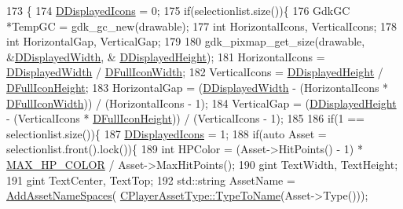 \begin{DoxyCode}
173                                                                                                            
                               \{
174     \hyperlink{classCUnitDescriptionRenderer_a0f2d234d02c615ac28812508c77ec414}{DDisplayedIcons} = 0;
175     \textcolor{keywordflow}{if}(selectionlist.size())\{
176         GdkGC *TempGC = gdk\_gc\_new(drawable);
177         \textcolor{keywordtype}{int} HorizontalIcons, VerticalIcons;
178         \textcolor{keywordtype}{int} HorizontalGap, VerticalGap;
179         
180         gdk\_pixmap\_get\_size(drawable, &\hyperlink{classCUnitDescriptionRenderer_a4c472ecc82b5956fc65aeebb2faf17fd}{DDisplayedWidth}, &
      \hyperlink{classCUnitDescriptionRenderer_acc5f08d377a050f778614561a0b12a6c}{DDisplayedHeight}); 
181         HorizontalIcons = \hyperlink{classCUnitDescriptionRenderer_a4c472ecc82b5956fc65aeebb2faf17fd}{DDisplayedWidth} / \hyperlink{classCUnitDescriptionRenderer_a4bd79032fe13b9c09386a24cb8ef7650}{DFullIconWidth};
182         VerticalIcons = \hyperlink{classCUnitDescriptionRenderer_acc5f08d377a050f778614561a0b12a6c}{DDisplayedHeight} / \hyperlink{classCUnitDescriptionRenderer_ae9f7d843d0eabd4b1f1b19bfa5332754}{DFullIconHeight};
183         HorizontalGap = (\hyperlink{classCUnitDescriptionRenderer_a4c472ecc82b5956fc65aeebb2faf17fd}{DDisplayedWidth} - (HorizontalIcons * 
      \hyperlink{classCUnitDescriptionRenderer_a4bd79032fe13b9c09386a24cb8ef7650}{DFullIconWidth})) / (HorizontalIcons - 1);
184         VerticalGap = (\hyperlink{classCUnitDescriptionRenderer_acc5f08d377a050f778614561a0b12a6c}{DDisplayedHeight} - (VerticalIcons * 
      \hyperlink{classCUnitDescriptionRenderer_ae9f7d843d0eabd4b1f1b19bfa5332754}{DFullIconHeight})) / (VerticalIcons - 1);
185 
186         \textcolor{keywordflow}{if}(1 == selectionlist.size())\{
187             \hyperlink{classCUnitDescriptionRenderer_a0f2d234d02c615ac28812508c77ec414}{DDisplayedIcons} = 1;
188             \textcolor{keywordflow}{if}(\textcolor{keyword}{auto} Asset = selectionlist.front().lock())\{
189                 \textcolor{keywordtype}{int} HPColor = (Asset->HitPoints() - 1) * \hyperlink{UnitDescriptionRenderer_8cpp_a0ab547ca394354fc0fadb53832ad086e}{MAX\_HP\_COLOR} / Asset->MaxHitPoints();
190                 gint TextWidth, TextHeight;
191                 gint TextCenter, TextTop;
192                 std::string AssetName = \hyperlink{classCUnitDescriptionRenderer_ae18d6862ae305bd5633558f86457270b}{AddAssetNameSpaces}(
      \hyperlink{classCPlayerAssetType_a66ce89c35b74940e9fc947a1f4b9e770}{CPlayerAssetType::TypeToName}(Asset->Type()));

\end{DoxyCode}
